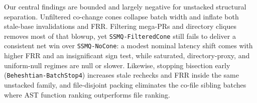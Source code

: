 Our central findings are bounded and largely negative for unstacked structural separation. Unfiltered co-change cones collapse batch width and inflate both stale-base invalidations and FRR. Filtering mega-PRs and directory cliques removes most of that blowup, yet \texttt{SSMQ-FilteredCone} still fails to deliver a consistent net win over \texttt{SSMQ-NoCone}: a modest nominal latency shift comes with higher FRR and an insignificant sign test, while saturated, directory-proxy, and uniform-null regimes are null or slower. Likewise, stopping bisection early (\texttt{Beheshtian-BatchStop4}) increases stale rechecks and FRR inside the same unstacked family, and file-disjoint packing eliminates the co-file sibling batches where AST function ranking outperforms file ranking.
